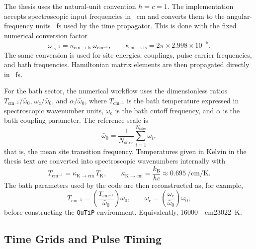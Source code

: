 The thesis uses the natural-unit convention \(\hbar=c=1\). The
implementation accepts spectroscopic input frequencies in
\si{\per\centi\metre} and converts them to the angular-frequency units
\si{\per\femto\second} used by the time propagator. This is done with the
fixed numerical conversion factor
\begin{equation*}
\omega_{\mathrm{fs}^{-1}}
=
\kappa_{\mathrm{cm}\to\mathrm{fs}}\,\omega_{\mathrm{cm}^{-1}},
\qquad
\kappa_{\mathrm{cm}\to\mathrm{fs}}
=
2\pi \times 2.998\times10^{-5}.
\end{equation*}
The same conversion is used for site energies, couplings, pulse carrier
frequencies, and bath frequencies. Hamiltonian matrix elements are then
propagated directly in \si{\per\femto\second}.

For the bath sector, the numerical workflow uses the dimensionless ratios
\(T_{\mathrm{cm}^{-1}}/\bar{\omega}_0\),
\(\omega_{\mathrm{c}}/\bar{\omega}_0\), and
\(\alpha/\bar{\omega}_0\), where \(T_{\mathrm{cm}^{-1}}\) is the bath
temperature expressed in spectroscopic wavenumber units,
\(\omega_{\mathrm{c}}\) is the bath cutoff frequency, and \(\alpha\) is the
bath-coupling parameter. The reference scale is
\begin{equation}
\bar{\omega}_0
=
\frac{1}{N_{\mathrm{sites}}}\sum_{i=1}^{N_{\mathrm{sites}}}\omega_i,
\label{eq:app_characteristic_optical_scale}
\end{equation}
that is, the mean site transition frequency. Temperatures given in
Kelvin in the thesis text are converted into spectroscopic
wavenumbers internally with
\begin{equation*}
T_{\mathrm{cm}^{-1}}
=
\kappa_{\mathrm{K}\to\mathrm{cm}}\,T_{\mathrm{K}},
\qquad
\kappa_{\mathrm{K}\to\mathrm{cm}}
=
\frac{k_{\mathrm{B}}}{hc}
\approx
0.695~\si{\per\centi\metre\per\kelvin}.
\end{equation*}
The bath parameters used by the code are then reconstructed as, for example,
\begin{equation*}
T_{\mathrm{cm}^{-1}}
=
\left(\frac{T_{\mathrm{cm}^{-1}}}{\bar{\omega}_0}\right)\bar{\omega}_0,
\qquad
\omega_{\mathrm{c}} = \left(\frac{\omega_{\mathrm{c}}}{\bar{\omega}_0}\right)\bar{\omega}_0,
\end{equation*}
before constructing the \texttt{QuTiP} environment.
Equivalently, \SI{16000}{\per\centi\metre}\approx\SI{23022}{\kelvin}.

\subsection{Time Grids and Pulse Timing}

